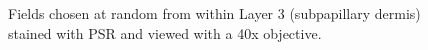 %

\begin{figure}[p]
\centering
  \caption{Fields chosen at random from within Layer 3 (subpapillary dermis) stained with PSR and viewed with a 40x objective.}
\vfill
  \label{fig:psr40x}
\end{figure}

%

